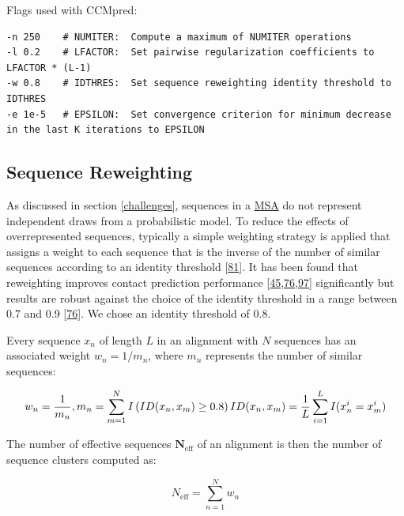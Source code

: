 \documentclass[12pt,a4paper,twoside]{book}
\newcommand{\neff}{N_\mathrm{eff}}
\theoremstyle{definition}
\theoremstyle{definition}
\theoremstyle{remark}
\begin{document}
Flags used with CCMpred:

\begin{verbatim}
-n 250    # NUMITER:  Compute a maximum of NUMITER operations
-l 0.2    # LFACTOR:  Set pairwise regularization coefficients to LFACTOR * (L-1) 
-w 0.8    # IDTHRES:  Set sequence reweighting identity threshold to IDTHRES
-e 1e-5   # EPSILON:  Set convergence criterion for minimum decrease in the last K iterations to EPSILON
\end{verbatim}

\subsection{Sequence Reweighting}\label{seq-reweighting}

As discussed in section \ref{challenges}, sequences in a
\protect\hyperlink{abbrev}{MSA} do not represent independent draws from
a probabilistic model. To reduce the effects of overrepresented
sequences, typically a simple weighting strategy is applied that assigns
a weight to each sequence that is the inverse of the number of similar
sequences according to an identity threshold
{[}\protect\hyperlink{ref-Stein2015a}{81}{]}. It has been found that
reweighting improves contact prediction performance
{[}\protect\hyperlink{ref-Jones2012}{45},\protect\hyperlink{ref-Morcos2011}{76},\protect\hyperlink{ref-Buslje2009}{97}{]}
significantly but results are robust against the choice of the identity
threshold in a range between 0.7 and 0.9
{[}\protect\hyperlink{ref-Morcos2011}{76}{]}. We chose an identity
threshold of 0.8.

Every sequence \(x_n\) of length \(L\) in an alignment with \(N\)
sequences has an associated weight \(w_n = 1/m_n\), where \(m_n\)
represents the number of similar sequences:

\begin{equation} 
  w_n = \frac{1}{m_n}, m_n = \sum_{m=1}^N I \left( ID(x_n, x_m) \geq 0.8 \right) \\
  ID(x_n, x_m)=\frac{1}{L} \sum_{i=1}^L I(x_n^i = x_m^i)
  \label{eq:seqweight}
\end{equation}

The number of effective sequences \(\mathbf{\neff}\) of an alignment is
then the number of sequence clusters computed as:

\begin{equation} 
  \neff = \sum_{n=1}^N w_n
  \label{eq:neff}
\end{equation}
\end{document}
